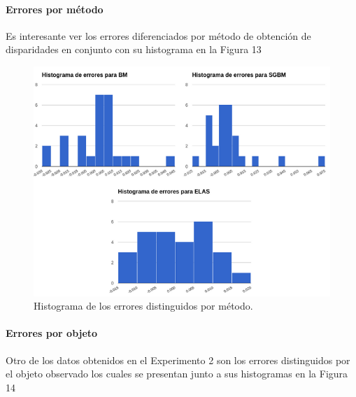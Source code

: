 \documentclass[11pt,a4paper,titlepage]{article}
\newcommand{\Figure}[1]{Figura #1}
\begin{document}
\paragraph{Errores por método}
\hfill \break
Es interesante ver los errores diferenciados por método de obtención de disparidades en conjunto con su histograma en la \Figure{13}


\begin{figure}[h!]

  \centering
    \includegraphics[width=1\textwidth]{f12.png}
  \caption{Histograma de los errores distinguidos por método.}
\end{figure}

\paragraph{Errores por objeto}
\hfill \break

Otro de los datos obtenidos en el Experimento 2 son los errores distinguidos por el objeto observado los cuales se presentan junto a sus histogramas en la \Figure{14}

\end{document}
